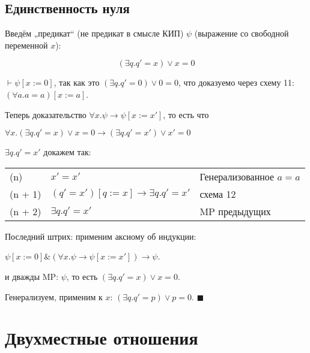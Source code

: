 \documentclass[12pt, a4paper]{article}
\begin{document}
\subsection{Единственность нуля}

Введём „предикат“ (не предикат в смысле КИП) $\psi$ (выражение со свободной переменной $x$):

\begin{equation}
    \left( \exists q. q' = x \right) \vee x = 0
\end{equation}

$\vdash \psi[x := 0]$, так как это $\left( \exists q. q' = 0 \right) \vee 0 = 0$, что доказуемо через схему 11: $(\forall a. a = a)[x := a]$.

Теперь доказательство $\forall x. \psi → \psi[x := x']$, то есть что 

$\forall x. \left( \exists q. q' = x \right) \vee x = 0 → \left( \exists q. q' = x' \right) \vee x' = 0$

$\exists q. q' = x'$ докажем так:

\begin{tabular}{lll}
    (n) & $x' = x'$ & Генерализованное $a = a$ \\
    (n + 1) & $(q' = x')[q := x] → \exists q. q' = x'$ & схема 12 \\
    (n + 2) & $\exists q. q' = x'$ & MP предыдущих
\end{tabular}

Последний штрих: применим аксиому об индукции: 

$\psi[x := 0] \& \left( \forall x. \psi → \psi[x := x'] \right) → \psi$.

и дважды MP: $\psi$, то есть $\left( \exists q. q' = x \right) \vee x = 0$.

Генерализуем, применим к $x$: $\left( \exists q. q' = p \right) \vee p = 0$. $\blacksquare$


\newpage

\section{Двухместные отношения}
\end{document}
